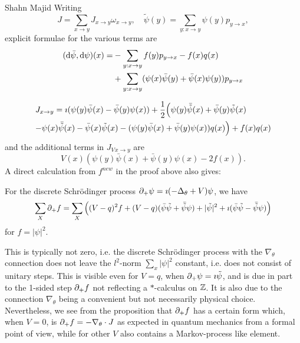 \begin{artengenv}{Shahn Majid}
Writing 
\[ J=\sum_{x\to y}J_{x\to y}\omega_{x\to y},\quad \tilde\psi(y)=\sum_{y:x\to y}\psi(y)p_{y\to x},\]
explicit formulae for the various terms are
\begin{align*}
({\rm d}\bar\psi,{\rm d}\psi)(x)=&-\sum_{y:x\to y}f(y)p_{y\to x}- f(x)q(x)\\
&+\sum_{y:x\to y}(\psi(x)\bar\psi(y)+\bar\psi(x)\psi(y))p_{y\to x}
\end{align*}

\begin{align*} &\scalemath{0.99}{J_{x\to y}=\imath(\psi(y)\bar\psi(x)- \bar\psi(y)\psi(x))+ {1\over 2}\Big(\psi(y)\bar{\tilde\psi}(x)+\bar\psi(y)\tilde\psi(x)}\\
&\scalemath{0.99}{-\psi(x)\bar{\tilde\psi}(x) -\bar\psi(x)\tilde\psi(x)
-(\psi(y)\bar\psi(x)+\bar\psi(y)\psi(x))q(x)\Big)+ f(x)q(x)}\end{align*}
and the additional terms in $J_V{}_{x\to y}$ are
\[ V(x)(\psi(y)\bar\psi(x)+\bar\psi(y)\psi(x)-2f(x)). \]
A direct calculation from $f^{new}$ in the proof above also gives:

\begin{proposition} For the discrete Schr\"odinger process ${\partial}_+\psi=\imath(-\Delta_\theta+V)\psi$, we have 
\[\scalemath{0.95}{ \sum_X \del_+ f=\sum_X\left((V-q)^2 f+ (V-q)(\bar\psi\tilde\psi+\bar{\tilde{\psi}}\psi)+ |\tilde\psi|^2+\imath(\bar\psi\tilde\psi-\bar{\tilde{\psi}}\psi)\right)}\]
for $f=|\psi|^2$. 
\end{proposition}

This is typically not zero, i.e. the discrete Schr\"odinger process with the $\nabla_\theta$ connection does not leave the $l^2$-norm $\sum_x |\psi|^2$ constant, i.e. does not consist of unitary steps. This is visible even for $V=q$, when ${\partial}_+\psi=\imath\tilde\psi$, and is due in part to the 1-sided step ${\partial}_+f$ not reflecting a $*$-calculus on ${\mathbb{Z}}$. It is also due to the connection $\nabla_\theta$ being a convenient but not necessarily physical choice. Nevertheless, we see from the proposition that ${\partial}_+f$ has a certain form which, when $V=0$, is ${\partial}_+ f=-\nabla_\theta\cdot J$ as expected in quantum mechanics from a formal point of view, while for other $V$ also contains a Markov-process like element. 


\end{artengenv}
